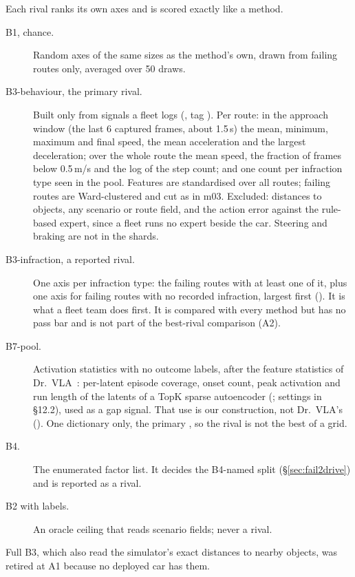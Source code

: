 Each rival ranks its own axes and is scored exactly like a method.
\begin{description}
  \item[B1, chance.] Random axes of the same sizes as the method's own, drawn
        from failing routes only, averaged over 50 draws.
  \item[B3-behaviour, the primary rival.] Built only from signals a fleet logs
        (, tag ). Per route: in the
        approach window (the last 6 captured frames, about 1.5\,s) the mean, minimum,
        maximum and final speed, the mean acceleration and the largest
        deceleration; over the whole route the mean speed, the fraction of frames
        below 0.5\,m/s and the log of the step count; and one count per infraction
        type seen in the pool. Features are standardised over all routes; failing
        routes are Ward-clustered and cut as in m03. Excluded: distances to
        objects, any scenario or route field, and the action error against the
        rule-based expert, since a fleet runs no expert beside the car.
        Steering and braking are not in the shards.
  \item[B3-infraction, a reported rival.] One axis per infraction type: the
        failing routes with at least one of it, plus one axis for failing routes
        with no recorded infraction, largest first ().
        It is what a fleet team does first. It is compared with every method but
        has no pass bar and is not part of the best-rival comparison (A2).
  \item[B7-pool.] Activation statistics with no outcome labels, after the
        feature statistics of Dr.~VLA~\cite{swann2026sparse}: per-latent episode
        coverage, onset count, peak activation and run length of the latents of a
        TopK sparse autoencoder (; settings in
         \S12.2), used as a gap signal. That use is our
        construction, not Dr.~VLA's (). One
        dictionary only, the primary , so the rival is not the
        best of a grid.
  \item[B4.] The enumerated factor list. It decides the B4-named split
        (\S\ref{sec:fail2drive}) and is reported as a rival.
  \item[B2 with labels.] An oracle ceiling that reads scenario fields; never a
        rival.
\end{description}
Full B3, which also read the simulator's exact distances to nearby objects, was
retired at A1 because no deployed car has them.

